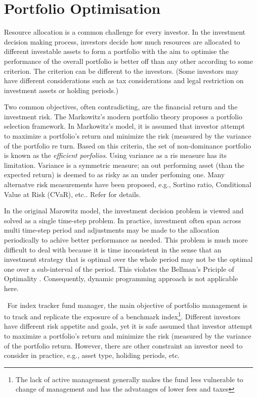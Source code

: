 \section{Portfolio Optimisation}
\label{sec:po}
Resource allocation is a common challenge for every investor. In the investment decision making process, investors decide how much resources are allocated to different investable assets to form a portfolio with the aim to optimise the performance of the overall portfolio is better off than any other according to some criterion. The criterion can be different to the investors. (Some investors may have different considerations such as tax considerations and legal restriction on investment assets or holding periods.)

Two common objectives, often contradicting, are the financial return and the investment risk. The Markowitz's modern portfolio theory \cite{HM52} proposes a portfolio selection framework. In Markowitz's model, it is assumed that investor attempt to maximize a portfolio's return and minimize the risk (measured by the variance of the portfolio re turn. Based on this criteria, the set of non-dominance portfolio is known as the \emph{efficient porfolios}. Using variance as a ris measure has its limitation. Variance is a symmetric measure; an out performing asset (than the expected return) is deemed to as risky as an under perfoming one. Many alternatve risk measurements have been proposed, e.g., Sortino ratio, Conditional Value at Risk (CVaR), etc.. Refer \cite{RTR00} for details.

In the original Marowitz model, the investment decision problem is viewed and solved as a single time-step problem. In practice, investment often span across multi time-step period and adjustments may be made to the allocation periodically to achive better performance as needed. This problem is much more difficult to deal with because it is time inconsistent in the sense that an investment strategy that is optimal over the whole period may not be the optimal one over a sub-interval of the period. This violates the Bellman's Priciple of Optimality \cite{BR57}. Consequently, dynamic programming approach is not applicable here.

\
For index tracker fund manager, the main objective of portfolio management is to track and replicate the exposure of a benchmark index\footnote{The lack of active management generally makes the fund less vulnerable to change of management and has the advatanges of lower fees and taxes}.
Different investors have different risk appetite and goals, yet it is safe assumed that investor attempt to maximize a portfolio's return and minimize the risk (measured by the variance of the portfolio return. However, there are other constraint an investor need to consider in practice, e.g., asset type, holiding periods, etc. 

